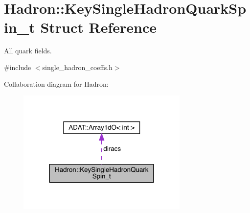 \hypertarget{structHadron_1_1KeySingleHadronQuarkSpin__t}{}\section{Hadron\+:\+:Key\+Single\+Hadron\+Quark\+Spin\+\_\+t Struct Reference}
\label{structHadron_1_1KeySingleHadronQuarkSpin__t}


All quark fields.  




{\ttfamily \#include $<$single\+\_\+hadron\+\_\+coeffs.\+h$>$}



Collaboration diagram for Hadron\+:\nopagebreak
\begin{figure}[H]
\begin{center}
\leavevmode
\includegraphics[width=239pt]{dd/ddd/structHadron_1_1KeySingleHadronQuarkSpin__t__coll__graph}
\end{center}
\end{figure}
